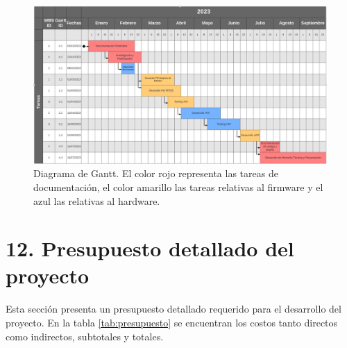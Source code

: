 \documentclass[
11pt, %
]{charter}
\begin{document}
\begin{landscape}
\begin{figure}[htpb]
\centering 
\includegraphics[height=.85\textheight]{./Figuras/diagGantt.png}
\caption{Diagrama de Gantt. El color rojo representa las tareas de documentación, el color amarillo las tareas relativas al firmware y el azul las relativas al hardware.}
\label{fig:diagGantt}
\end{figure}

\end{landscape}


\section{12. Presupuesto detallado del proyecto}
\label{sec:presupuesto}

Esta sección presenta un presupuesto detallado requerido para el desarrollo del proyecto. En la tabla \ref{tab:presupuesto} se encuentran los costos tanto directos como indirectos, subtotales y totales.
\end{document}
